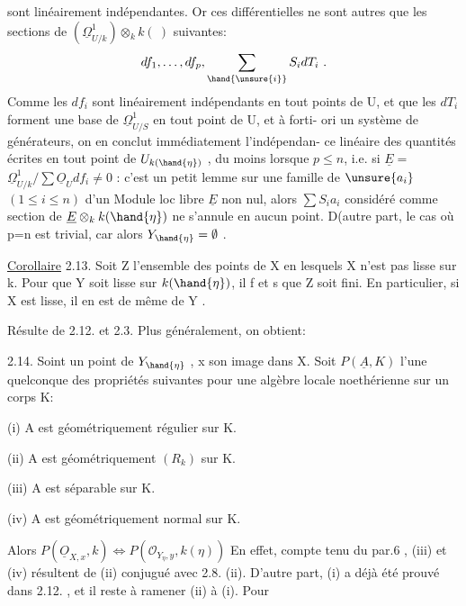 
sont linéairement indépendantes. Or ces différentielles ne sont autres
que les sections de $(\underline{\Omega}^1_{U/k})\otimes_k k(\ )$ suivantes:
\[ df_1, \ldots, df_p , \sum_{\hand{\unsure{i}}} S_i dT_i \ . \]
Comme les $df_i$ sont linéairement indépendants en tout points de U, et
que les $dT_i$ forment une base de $\underline{\Omega}^1_{U/S}$ en tout point de U,  et à forti-%
ori un système de générateurs, on en conclut immédiatement l'indépendan-%
ce linéaire des quantités écrites en tout point de $U_{k(\hand{\eta})}$ , du moins
lorsque $p\leq n$, i.e. si $\underline{E} =$ $\underline{\Omega}^1_{U/k} / \sum \underline{O}_U df_i \neq 0$ : c'est un petit
lemme sur une famille de  $\unsure{a_i}$ $(1 \leq i \leq n)$ d'un Module loc libre $\underline{E}$ non
nul, alors $\sum S_i a_i$ considéré comme section de $\underline{E}\otimes_k k(\hand{\eta})$ ne s'annule
en aucun point. D(autre part, le cas où p=n est trivial, car alors
$Y_{\hand{\eta}} = \emptyset$ .

\uline{Corollaire} 2.13. Soit Z l'ensemble des points de X en lesquels X
n'est pas lisse sur k. Pour que Y soit lisse sur $k(\hand{\eta})$, il f et s
que Z soit fini. En particulier, si X est lisse, il en est de même de
Y .

Résulte de 2.12. et 2.3. Plus généralement, on obtient:

\uline{} 2.14. Soint  un point de $Y_{\hand{\eta}}$ , x son image dans X. Soit
$P(\underline{A},K)$  l'une quelconque des propriétés suivantes pour une algèbre
locale noethérienne sur un corps K:

(i) A est géométriquement régulier sur K.

(ii) A est géométriquement $(R_k)$ sur K.

(iii) A est séparable sur K.

(iv) A est géométriquement normal sur K.

Alors $P(\underline{O}_{X,x}, k) \Longleftrightarrow P(\mathcal{O}_{Y_\eta,y}, k(\eta))$
 En effet, compte tenu du par.6 , (iii) et (iv)
résultent de (ii) conjugué avec 2.8. (ii). D'autre part, (i)
a déjà été prouvé dans 2.12. , et il reste à ramener (ii) à (i). Pour

